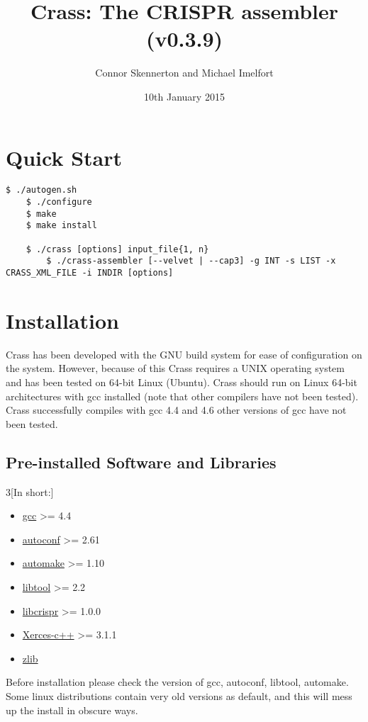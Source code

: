 \documentclass[11pt]{article} %
\title{Crass:  The CRISPR assembler (v0.3.9)}
\author{Connor Skennerton and Michael Imelfort}
\date{10th January 2015} %
\newenvironment{warning}
  {\par\vspace{0.3cm}\begin{mdframed}[linewidth=2pt,linecolor=red]%
    \begin{list}{}{\leftmargin=1cm}
\sffamily\item[\color{red}\ding{43}]}
  {\end{list}\end{mdframed}\par\vspace{0.3cm}}
\begin{document}
\maketitle

\tableofcontents
\newpage
\section{Quick Start}
\begin{lstlisting}[style=BashInputStyle]
	$ ./autogen.sh
	$ ./configure
	$ make
	$ make install
	
	$ ./crass [options] input_file{1, n}
        $ ./crass-assembler [--velvet | --cap3] -g INT -s LIST -x CRASS_XML_FILE -i INDIR [options]
\end{lstlisting}
\section{Installation}
Crass has been developed with the GNU build system for ease of configuration on the system.  However, because of this Crass requires a UNIX operating system and has been tested on 64-bit Linux (Ubuntu).  Crass should run on Linux 64-bit architectures with gcc installed (note that other compilers have not been tested).  Crass successfully compiles with gcc 4.4 and 4.6 other versions of gcc have not been tested.    

\subsection{Pre-installed Software and Libraries}
\begin{multicols}{3}[In short:]
\begin{itemize}
\item \href{http://gcc.gnu.org/}{gcc} \textgreater= 4.4
\item \href{http://www.gnu.org/software/autoconf/}{autoconf}  \textgreater= 2.61
\item \href{http://www.gnu.org/software/automake/}{automake} \textgreater= 1.10
\item \href{http://www.gnu.org/software/libtool/}{libtool} \textgreater= 2.2
\item \href{http://ctskennerton.github.com/libcrispr}{libcrispr} \textgreater= 1.0.0
\item \href{http://xerces.apache.org/}{Xerces-c++} \textgreater= 3.1.1
\item \href{http://zlib.net/}{zlib}
\end{itemize}
\end{multicols}
\begin{warning}
 Before installation please check the version of gcc, autoconf, libtool, automake. Some linux distributions contain very old versions as default, and this will mess up the install in obscure ways. 
\end{warning}
\end{document}
